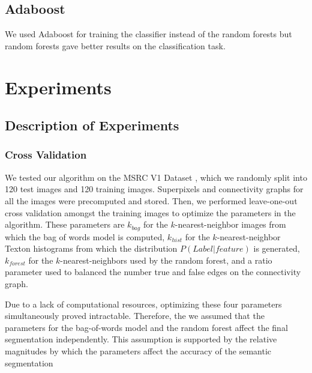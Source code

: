 \documentclass{article} %
\begin{document}
\subsection{Adaboost}
We used Adaboost \cite{Freund96experimentswith} for training the classifier instead of the random forests but random forests gave better results on the classification task. 



\section{Experiments}
\label{sec:Exp}


\subsection{Description of Experiments}
\label{sec:Description}

\subsubsection{Cross Validation}
\label{sec:cross}
We tested our algorithm on the MSRC V1 Dataset \cite{MSRC}, which we randomly split into 120 test images and 120 training images.
Superpixels and connectivity graphs for all the images were precomputed and stored.
Then, we performed leave-one-out cross validation amongst the training images to optimize the parameters in the algorithm.
These parameters are $k_{bag}$ for the $k$-nearest-neighbor images from which the bag of words model is computed, $k_{hist}$ for the $k$-nearest-neighbor Texton histograms from which the distribution $P(Label | feature)$ is generated, $k_{forest}$ for the $k$-nearest-neighbors used by the random forest, and a ratio parameter used to balanced the number true and false edges on the connectivity graph. 

Due to a lack of computational resources, optimizing these four parameters simultaneously proved intractable. Therefore, the we assumed that the parameters for the bag-of-words model and the random forest affect the final segmentation independently. This assumption is supported by the relative magnitudes by which the parameters affect the accuracy of the semantic segmentation
\end{document}
